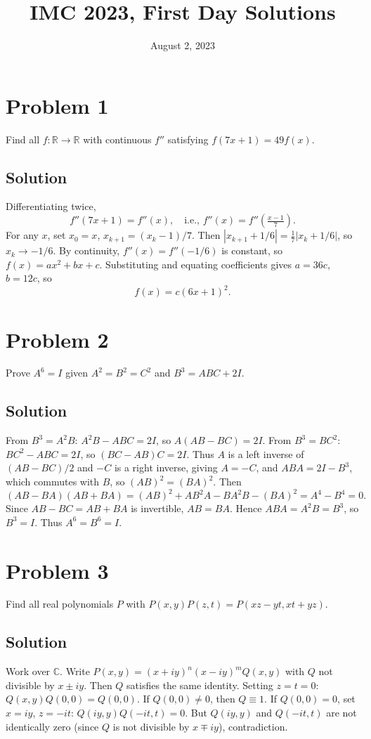 \documentclass{article}
\title{IMC 2023, First Day Solutions}
\date{August 2, 2023}
\begin{document}
\maketitle

\section*{Problem 1}
Find all $f: \mathbb{R} \to \mathbb{R}$ with continuous $f''$ satisfying $f(7x+1) = 49 f(x)$.

\subsection*{Solution}
Differentiating twice,
\[ f''(7x+1) = f''(x), \quad \text{i.e., } f''(x) = f''\left(\tfrac{x-1}{7}\right). \]
For any $x$, set $x_0 = x$, $x_{k+1} = (x_k-1)/7$. Then $|x_{k+1} + 1/6| = \tfrac{1}{7}|x_k + 1/6|$, so $x_k \to -1/6$. By continuity, $f''(x) = f''(-1/6)$ is constant, so $f(x) = ax^2 + bx + c$. Substituting and equating coefficients gives $a = 36c$, $b = 12c$, so
\[ f(x) = c(6x+1)^2. \]

\section*{Problem 2}
Prove $A^6 = I$ given $A^2 = B^2 = C^2$ and $B^3 = ABC + 2I$.

\subsection*{Solution}
From $B^3 = A^2 B$: $A^2 B - ABC = 2I$, so $A(AB - BC) = 2I$. From $B^3 = BC^2$: $BC^2 - ABC = 2I$, so $(BC - AB)C = 2I$. Thus $A$ is a left inverse of $(AB - BC)/2$ and $-C$ is a right inverse, giving $A = -C$, and $ABA = 2I - B^3$, which commutes with $B$, so $(AB)^2 = (BA)^2$. Then
\[ (AB - BA)(AB + BA) = (AB)^2 + AB^2A - BA^2B - (BA)^2 = A^4 - B^4 = 0. \]
Since $AB - BC = AB + BA$ is invertible, $AB = BA$. Hence $ABA = A^2 B = B^3$, so $B^3 = I$. Thus $A^6 = B^6 = I$.

\section*{Problem 3}
Find all real polynomials $P$ with $P(x,y)P(z,t) = P(xz-yt, xt+yz)$.

\subsection*{Solution}
Work over $\mathbb{C}$. Write $P(x,y) = (x+iy)^n (x-iy)^m Q(x,y)$ with $Q$ not divisible by $x \pm iy$. Then $Q$ satisfies the same identity. Setting $z = t = 0$: $Q(x,y) Q(0,0) = Q(0,0)$. If $Q(0,0) \neq 0$, then $Q \equiv 1$. If $Q(0,0) = 0$, set $x = iy$, $z = -it$: $Q(iy,y) Q(-it,t) = 0$. But $Q(iy,y)$ and $Q(-it,t)$ are not identically zero (since $Q$ is not divisible by $x \mp iy$), contradiction.
\end{document}
